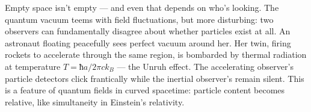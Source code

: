 Empty space isn't empty — and even that depends on who's looking. The quantum vacuum teems with field fluctuations, but more disturbing: two observers can fundamentally disagree about whether particles exist at all. An astronaut floating peacefully sees perfect vacuum around her. Her twin, firing rockets to accelerate through the same region, is bombarded by thermal radiation at temperature $T = ħa/2πck_B$ — the Unruh effect. The accelerating observer's particle detectors click frantically while the inertial observer's remain silent. This is a feature of quantum fields in curved spacetime: particle content becomes relative, like simultaneity in Einstein's relativity. 